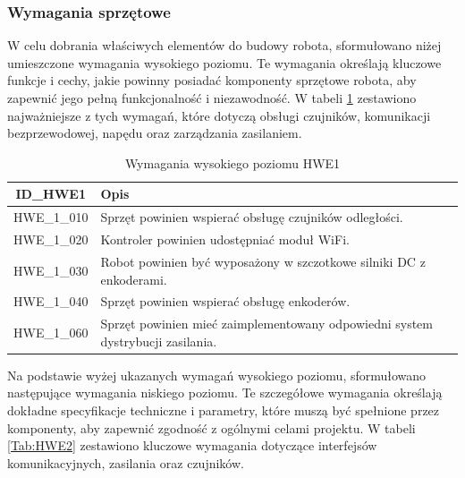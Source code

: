 \documentclass[12pt,twoside]{article}
\begin{document}
\subsubsection{Wymagania sprzętowe}

W celu dobrania właściwych elementów do budowy robota, sformułowano niżej umieszczone wymagania wysokiego poziomu. Te wymagania określają kluczowe funkcje i cechy, jakie powinny posiadać komponenty sprzętowe robota, aby zapewnić jego pełną funkcjonalność i niezawodność. W tabeli \ref{Tab:HWE1} zestawiono najważniejsze z tych wymagań, które dotyczą obsługi czujników, komunikacji bezprzewodowej, napędu oraz zarządzania zasilaniem.

\begin{table}[ht]
\caption{Wymagania wysokiego poziomu HWE1}
\centering		
	\begin{tabular}{|c|p{}|}	
		\hline
		ID\_HWE1 & Opis \\
		\hline
		HWE\_1\_010 & Sprzęt powinien wspierać obsługę czujników odległości. \\
		\hline
		HWE\_1\_020 & Kontroler powinien udostępniać moduł WiFi. \\
		\hline 
		HWE\_1\_030 & Robot powinien być wyposażony w szczotkowe silniki DC z enkoderami.\\
		\hline
		HWE\_1\_040 & Sprzęt powinien wspierać obsługę enkoderów. \\
		\hline
		HWE\_1\_060 & Sprzęt powinien mieć zaimplementowany odpowiedni system dystrybucji zasilania. \\
		\hline

	\end{tabular}	
	
\label{Tab:HWE1}
\end{table}	

\newpage

Na podstawie wyżej ukazanych wymagań wysokiego poziomu, sformułowano następujące wymagania niskiego poziomu. Te szczegółowe wymagania określają dokładne specyfikacje techniczne i parametry, które muszą być spełnione przez komponenty, aby zapewnić zgodność z ogólnymi celami projektu. W tabeli \ref{Tab:HWE2} zestawiono kluczowe wymagania dotyczące interfejsów komunikacyjnych, zasilania oraz czujników.
\end{document}
